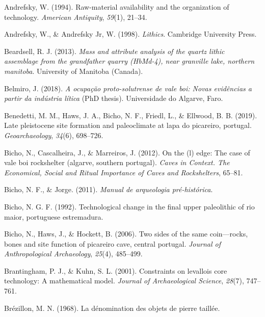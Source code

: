\documentclass[12pt,twoside]{reedthesis}
\begin{document}
\leavevmode\hypertarget{ref-andrefsky1994}{}%
Andrefsky, W. (1994). Raw-material availability and the organization of technology. \emph{American Antiquity}, \emph{59}(1), 21--34.

\leavevmode\hypertarget{ref-andrefsky1998}{}%
Andrefsky, W., \& Andrefsky Jr, W. (1998). \emph{Lithics}. Cambridge University Press.

\leavevmode\hypertarget{ref-beardsell2013}{}%
Beardsell, R. J. (2013). \emph{Mass and attribute analysis of the quartz lithic assemblage from the grandfather quarry (HbMd-4), near granville lake, northern manitoba}. University of Manitoba (Canada).

\leavevmode\hypertarget{ref-belmiro2018}{}%
Belmiro, J. (2018). \emph{A ocupação proto-solutrense de vale boi: Novas evidências a partir da indústria lítica} (PhD thesis). Universidade do Algarve, Faro.

\leavevmode\hypertarget{ref-benedettietal2019}{}%
Benedetti, M. M., Haws, J. A., Bicho, N. F., Friedl, L., \& Ellwood, B. B. (2019). Late pleistocene site formation and paleoclimate at lapa do picareiro, portugal. \emph{Geoarchaeology}, \emph{34}(6), 698--726.

\leavevmode\hypertarget{ref-bichoetal2012}{}%
Bicho, N., Cascalheira, J., \& Marreiros, J. (2012). On the (l) edge: The case of vale boi rockshelter (algarve, southern portugal). \emph{Caves in Context. The Economical, Social and Ritual Importance of Caves and Rockshelters}, 65--81.

\leavevmode\hypertarget{ref-bicho2011}{}%
Bicho, N. F., \& Jorge. (2011). \emph{Manual de arqueologia pré-histórica}.

\leavevmode\hypertarget{ref-bicho1992}{}%
Bicho, N. G. F. (1992). Technological change in the final upper paleolithic of rio maior, portuguese estremadura.

\leavevmode\hypertarget{ref-bicho2006}{}%
Bicho, N., Haws, J., \& Hockett, B. (2006). Two sides of the same coin---rocks, bones and site function of picareiro cave, central portugal. \emph{Journal of Anthropological Archaeology}, \emph{25}(4), 485--499.

\leavevmode\hypertarget{ref-brantingham2001}{}%
Brantingham, P. J., \& Kuhn, S. L. (2001). Constraints on levallois core technology: A mathematical model. \emph{Journal of Archaeological Science}, \emph{28}(7), 747--761.

\leavevmode\hypertarget{ref-brezillon1968}{}%
Brézillon, M. N. (1968). La dénomination des objets de pierre taillée.
\end{document}
